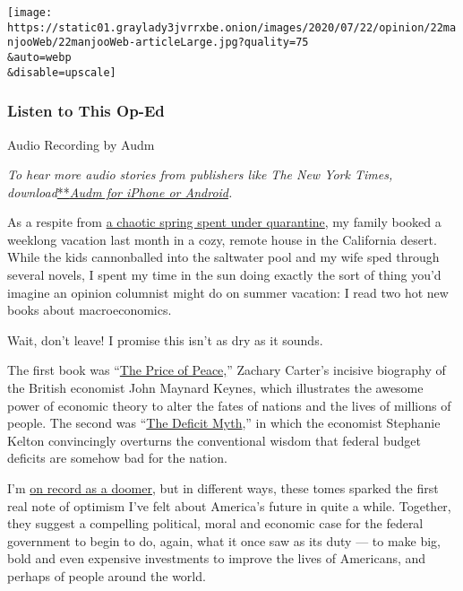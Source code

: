 \texttt{[image: https://static01.graylady3jvrrxbe.onion/images/2020/07/22/opinion/22manjooWeb/22manjooWeb-articleLarge.jpg?quality=75\\\&auto=webp\\\&disable=upscale]}

\hypertarget{listen-to-this-op-ed}{%
\subsubsection{Listen to This Op-Ed}\label{listen-to-this-op-ed}}

Audio Recording by Audm

\emph{To hear more audio stories from publishers like The New York
Times,
download}\href{https://www.audm.com/?utm_source=nytmag\&utm_medium=embed\&utm_campaign=left_behind_draper}{**}\href{https://www.audm.com/?utm_source=nytopinion\&utm_medium=embed\&utm_campaign=fix_america_spend}{\emph{Audm
for iPhone or Android}}\emph{.}

As a respite from
\href{https://www.nytimes3xbfgragh.onion/2020/04/22/opinion/coronavirus-parenting-burnout.html}{a
chaotic spring spent under quarantine}, my family booked a weeklong
vacation last month in a cozy, remote house in the California desert.
While the kids cannonballed into the saltwater pool and my wife sped
through several novels, I spent my time in the sun doing exactly the
sort of thing you'd imagine an opinion columnist might do on summer
vacation: I read two hot new books about macroeconomics.

Wait, don't leave! I promise this isn't as dry as it sounds.

The first book was
``\href{https://www.nytimes3xbfgragh.onion/2020/05/20/books/review-price-of-peace-john-maynard-keynes-zachary-carter.html?auth=login-email\&login=email}{The
Price of Peace,}'' Zachary Carter's incisive biography of the British
economist John Maynard Keynes, which illustrates the awesome power of
economic theory to alter the fates of nations and the lives of millions
of people. The second was
``\href{https://www.nytimes3xbfgragh.onion/2020/06/09/opinion/us-deficit-coronavirus.html}{The
Deficit Myth},'' in which the economist Stephanie Kelton convincingly
overturns the conventional wisdom that federal budget deficits are
somehow bad for the nation.

I'm
\href{https://www.nytimes3xbfgragh.onion/2020/05/20/opinion/coronavirus-worst-case.html}{on
record as a doomer}, but in different ways, these tomes sparked the
first real note of optimism I've felt about America's future in quite a
while. Together, they suggest a compelling political, moral and economic
case for the federal government to begin to do, again, what it once saw
as its duty --- to make big, bold and even expensive investments to
improve the lives of Americans, and perhaps of people around the world.

